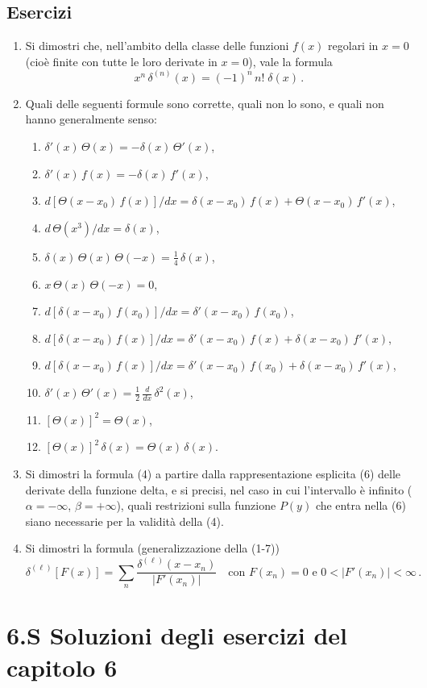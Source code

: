 \documentclass[11pt, a4paper]{book}
\numberwithin{equation}{section}
\newenvironment{esercizi}{\subsection*{Esercizi}\begin{enumerate}}{\end{enumerate}}
\begin{document}
\begin{esercizi}
\item Si dimostri che, nell'ambito della classe delle funzioni $f(x)$ regolari in $x=0$ (cioè finite con tutte le loro derivate in $x=0$), vale la formula
\[
x^n\, \delta^{(n)}(x) = (-1)^n\, n!\; \delta(x) \,.
\]
\item Quali delle seguenti formule sono corrette, quali non lo sono, e quali non hanno generalmente senso:
\begin{enumerate}
\item $\delta'(x)\,\Theta(x) = -\delta(x)\,\Theta'(x)$,
\item $\delta'(x)\, f(x) = -\delta(x)\, f'(x)$,
\item $d[\Theta(x-x_0)\, f(x)]/dx = \delta(x-x_0)\, f(x) + \Theta(x-x_0)\, f'(x)$,
\item $d\,\Theta(x^3)/dx = \delta(x)$,
\item $\delta(x)\,\Theta(x)\,\Theta(-x) = \frac{1}{4}\,\delta(x)$,
\item $x\,\Theta(x)\,\Theta(-x) = 0$,
\item $d[\delta(x-x_0)\, f(x_0)]/dx = \delta'(x-x_0)\, f(x_0)$,
\item $d[\delta(x-x_0)\, f(x)]/dx = \delta'(x-x_0)\, f(x) + \delta(x-x_0)\, f'(x)$,
\item $d[\delta(x-x_0)\, f(x)]/dx = \delta'(x-x_0)\, f(x_0) + \delta(x-x_0)\, f'(x)$, %
\item $\delta'(x)\,\Theta'(x) = \frac{1}{2}\,\frac{d}{dx}\,\delta^2(x)$,
\item $[\Theta(x)]^2 = \Theta(x)$,
\item $[\Theta(x)]^2\,\delta(x) = \Theta(x)\,\delta(x)$.
\end{enumerate}
\item Si dimostri la formula (4) a partire dalla rappresentazione esplicita (6) delle derivate della funzione delta, e si precisi, nel caso in cui l'intervallo è infinito ($\alpha = -\infty$, $\beta = +\infty$), quali restrizioni sulla funzione $P(y)$ che entra nella (6) siano necessarie per la validità della (4).
\item Si dimostri la formula (generalizzazione della (1-7))
\[
\delta^{(\ell)}[F(x)] = \sum_{n} \frac{\delta^{(\ell)}(x - x_n)}{|F'(x_n)|} \quad \text{con } F(x_n) = 0 \text{ e } 0 < |F'(x_n)| < \infty \,.
\]
\end{esercizi}

\section*{6.S \quad Soluzioni degli esercizi del capitolo 6}
\end{document}
